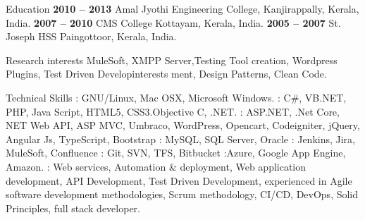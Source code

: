 \documentclass{resume}
\author{Babin Babu}
\begin{document}
\maketitle


\begin{category}{Education}
  \hfill \textbf{2010 -- 2013}
  \citemnobullet Amal Jyothi Engineering College, Kanjirappally, Kerala, India.
  \hfill \textbf{2007 -- 2010}
  \citemnobullet CMS College Kottayam, Kerala, India.
  \hfill \textbf{2005 -- 2007}
  \citemnobullet St. Joseph HSS Paingottoor, Kerala, India.
\end{category}


\begin{category}{Research interests}
  \citemnobullet MuleSoft, XMPP Server,Testing Tool creation, Wordpress Plugins, Test Driven Developinterests ment, Design Patterns, Clean Code.
\end{category}

\begin{category}{Technical Skills}
  : GNU/Linux, Mac OSX, Microsoft Windows.
  : C\#, VB.NET, PHP, Java Script, HTML5, CSS3.Objective C, .NET.
  : ASP.NET, .Net Core, NET Web API, ASP MVC, Umbraco, WordPress, Opencart, Codeigniter, jQuery, Angular Js, TypeScript, Bootstrap
  : MySQL, SQL Server, Oracle
  :  Jenkins, Jira, MuleSoft, Confluence
  : Git, SVN, TFS, Bitbucket
  :Azure, Google App Engine, Amazon.
  : Web services, Automation \& deployment, Web application development, API Development, Test Driven Development, experienced in Agile software development methodologies, Scrum methodology, CI/CD, DevOps, Solid Principles, full stack developer.
\end{category}

\end{document}
